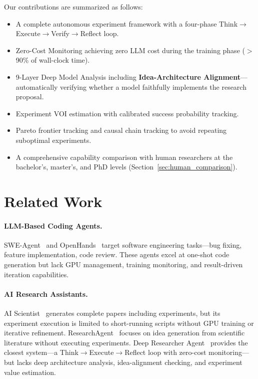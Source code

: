 \documentclass[11pt,a4paper]{article}
\begin{document}
Our contributions are summarized as follows:
\begin{itemize}[nosep]
\item A complete autonomous experiment framework with a four-phase Think$\to$Execute$\to$Verify$\to$Reflect loop.
\item Zero-Cost Monitoring achieving zero LLM cost during the training phase ($>$90\% of wall-clock time).
\item 9-Layer Deep Model Analysis including \textbf{Idea-Architecture Alignment}---automatically verifying whether a model faithfully implements the research proposal.
\item Experiment VOI estimation with calibrated success probability tracking.
\item Pareto frontier tracking and causal chain tracking to avoid repeating suboptimal experiments.
\item A comprehensive capability comparison with human researchers at the bachelor's, master's, and PhD levels (Section~\ref{sec:human_comparison}).
\end{itemize}


\section{Related Work}

\paragraph{LLM-Based Coding Agents.}
SWE-Agent~\cite{yang2024swe} and OpenHands~\cite{wang2024openhands} target software engineering tasks---bug fixing, feature implementation, code review.
These agents excel at one-shot code generation but lack GPU management, training monitoring, and result-driven iteration capabilities.

\paragraph{AI Research Assistants.}
AI Scientist~\cite{lu2024ai} generates complete papers including experiments, but its experiment execution is limited to short-running scripts without GPU training or iterative refinement.
ResearchAgent~\cite{baek2024researchagent} focuses on idea generation from scientific literature without executing experiments.
Deep Researcher Agent~\cite{zhang2026deep} provides the closest system---a Think$\to$Execute$\to$Reflect loop with zero-cost monitoring---but lacks deep architecture analysis, idea-alignment checking, and experiment value estimation.
\end{document}
